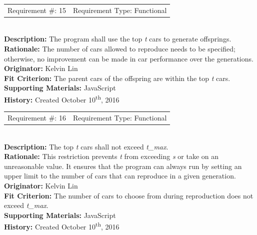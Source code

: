 \documentclass[12pt, titlepage]{article}
\begin{document}
\begin{reqbox}
	\begin{tabular}{cc}
		Requirement \#: 15 & Requirement Type: Functional \\
	\end{tabular} \\
	\textbf{Description:} The program shall use the top \textit{t} cars to generate 
	offsprings. \\
	\textbf{Rationale:} The number of cars allowed to reproduce needs to be 
	specified; otherwise, no improvement can be made in car performance over the 
	generations. \\
	\textbf{Originator:} Kelvin Lin\\
	\textbf{Fit Criterion:} The parent cars of the offspring are within the top 
	\textit{t} cars.\\
	\textbf{Supporting Materials:} JavaScript \\
	\textbf{History:} Created October 10\textsuperscript{th}, 2016
\end{reqbox}

\newpage

\begin{reqbox}
	\begin{tabular}{cc}
		Requirement \#: 16 & Requirement Type: Functional \\
	\end{tabular} \\
	\textbf{Description:} The top \textit{t} cars shall not exceed \textit{t\_max}. 
	\\
	\textbf{Rationale:} This restriction prevents \textit{t} from exceeding 
	\textit{s} or take on an unreasonable value. It ensures that the program can 
	always run by setting an upper limit to the number of cars that can reproduce 
in 
	a given generation. \\
	\textbf{Originator:} Kelvin Lin\\
	\textbf{Fit Criterion:} The number of cars to choose from during reproduction 
	does not exceed \textit{t\_max}.\\
	\textbf{Supporting Materials:} JavaScript \\
	\textbf{History:} Created October 10\textsuperscript{th}, 2016
\end{reqbox}
\end{document}
